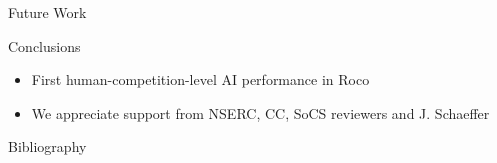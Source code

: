 \documentclass[aspectratio=169,usenames,dvipsnames]{beamer}
\newcommand{\tcb}[1]{\textcolor{m1}{#1}}
\newcommand{\bei}{\begin{itemize}}
\newcommand{\eei}{\end{itemize}}
\newcommand{\ie}{\item}
\numberwithin{equation}{section}
\numberwithin{theorem}{section}
\numberwithin{lem}{section}
\numberwithin{df}{section}
\begin{document}

\begin{frame}{Future Work}


\end{frame}



\begin{frame}{Conclusions}

\bei

\ie First human-competition-level AI performance in {\sc Roco}


\bigskip
\bigskip
\bigskip
\bigskip

\ie \tcb{We appreciate support from NSERC, CC, SoCS reviewers and J. Schaeffer}

\eei


\end{frame}


\begin{frame}[allowframebreaks]{Bibliography}
\renewcommand*{\bibfont}{\footnotesize}
\printbibliography
\end{frame}

\end{document}
